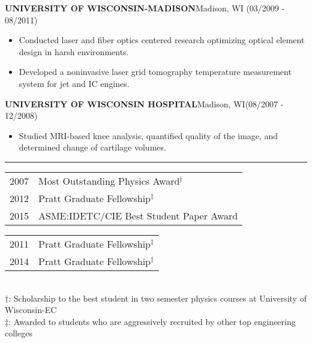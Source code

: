 \documentclass[11pt,letterpaper]{article}
\newcommand{\sect}[1]{\vspace{8mm}{\centering {\bf \large \scshape \uppercase{#1}} \par}  \vskip 2mm   {\color{blue} \hrule height 1pt}\vspace{2mm}}
\begin{document}
  \MakeUppercase{\bf University of Wisconsin-Madison}\hfill{Madison, WI}{ (03/2009 - 08/2011)}\\
  \begin{itemize}
  \item Conducted laser and fiber optics centered research optimizing optical element design in harsh environments.
  \item Developed a noninvasive laser grid tomography temperature measurement system for jet and IC engines.
  \end{itemize}

  \MakeUppercase{\bf University of Wisconsin Hospital}\hfill{Madison, WI}{ {(08/2007 - 12/2008)}}\\
  \begin{itemize}
  \item Studied MRI-based knee analysis, quantified quality of the image, and determined change of cartilage volumes.
  \end{itemize}

  \sect{honors and awards}
  \hspace{0mm}
  \begin{minipage}{\columnwidth}
  \begin{minipage}{0.5\columnwidth}
  \begin{tabular}{l l}
  2007 & Most Outstanding Physics Award$^\dagger$ \\
  2012 & Pratt Graduate Fellowship$^\ddagger$\\
  2015 & ASME:IDETC/CIE Best Student Paper Award\\
  \end{tabular}
  \end{minipage}
  \hfill
  \begin{minipage}{0.4\columnwidth}
  \begin{tabular}{l l}
  2011 & Pratt Graduate Fellowship$^\ddagger$ \\
  2014 & Pratt Graduate Fellowship$^\ddagger$\\
  \end{tabular}
  \end{minipage}
  \\
  \vspace{5mm}
  $\dagger$: Scholarship to the best student in two semester physics courses at University of Wisconsin-EC\\
  $\ddagger$: Awarded to students who are aggressively recruited by other top engineering colleges\\
  \end{minipage}
\end{document}
